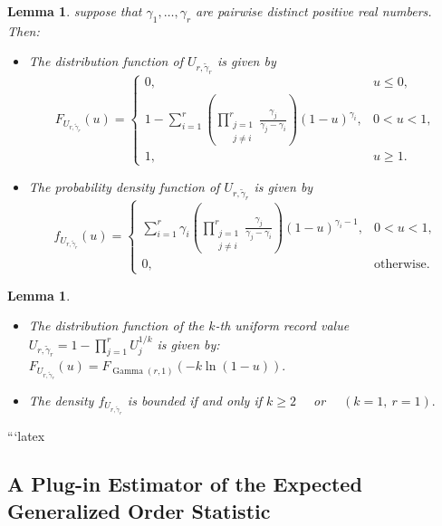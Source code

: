 \documentclass[authoryear,preprint,3p,review,10pt]{elsarticle}
\newtheorem{lemma}[theorem]{Lemma}
\theoremstyle{definition}
\begin{document}
	
	\begin{lemma}\label{cdf_U}
		suppose that \(\gamma_1,\ldots,\gamma_r\) are pairwise distinct positive real numbers. Then:
		\begin{itemize}
			
			
			\item The distribution function of \(U_{r,\tilde{\gamma}_r}\) is given by
			\[
			F_{U_{r,\tilde{\gamma}_r}}(u)=
			\begin{cases}
				0, & u\le 0,\\[6pt]
				1-\displaystyle\sum_{i=1}^{r}
				\left(
				\prod_{\substack{j=1\\j\ne i}}^{r}
				\frac{\gamma_j}{\gamma_j-\gamma_i}
				\right)(1-u)^{\gamma_i},
				& 0<u<1,\\[12pt]
				1, & u\ge 1.
			\end{cases}
			\]
			
			
			\item The probability density function of \(U_{r,\tilde{\gamma}_r}\) is given by
			\[
			f_{U_{r,\tilde{\gamma}_r}}(u)=
			\begin{cases}
				\displaystyle
				\sum_{i=1}^{r}
				\gamma_i
				\left(
				\prod_{\substack{j=1\\j\ne i}}^{r}
				\frac{\gamma_j}{\gamma_j-\gamma_i}
				\right)
				(1-u)^{\gamma_i-1},
				& 0<u<1,\\[12pt]
				0, & \text{otherwise}.
			\end{cases}
			\]
			
		\end{itemize}
	\end{lemma}
	\begin{lemma}\label{CDF_record}
		\begin{itemize}
			\item The distribution function of the $k$-th uniform record value $U_{r,\tilde{\gamma}_r}=1-\prod_{j=1}^{r}U_j^{1/k}$ is given by: $F_{U_{r,\tilde{\gamma}_r}}(u)=F_{\operatorname{Gamma}(r,1)}(-k\ln(1-u)).$
			
			
			\item The density $f_{U_{r,\tilde{\gamma}_r}}$ is bounded if and only if $k\ge2\quad$ or $\quad (k=1,\ r=1).$
		\end{itemize}
	\end{lemma}
	
	```latex
	\subsection{A Plug-in Estimator of the Expected Generalized Order Statistic}
	
\end{document}
